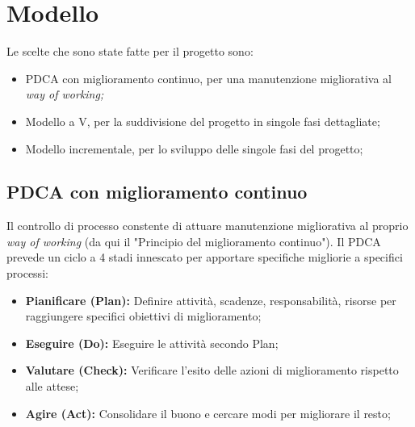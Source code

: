 \chapter{Modello}
Le scelte che sono state fatte per il progetto sono:
\begin{itemize}
    \item PDCA con miglioramento continuo, per una manutenzione migliorativa al \it{way of working};
    \item Modello a V, per la suddivisione del progetto in singole fasi dettagliate;
    \item Modello incrementale, per lo sviluppo delle singole fasi del progetto;
\end{itemize}

\section{PDCA con miglioramento continuo}
Il controllo di processo constente di attuare manutenzione migliorativa al proprio {\it{way of working}} (da qui il "Principio del miglioramento continuo"). Il PDCA prevede un ciclo a 4 stadi innescato per apportare specifiche migliorie a specifici processi:
\begin{itemize}
    \item \textbf{Pianificare (Plan):} Definire attività, scadenze, responsabilità, risorse per raggiungere
    specifici obiettivi di miglioramento; 
    \item \textbf{Eseguire (Do):} Eseguire le attività secondo Plan; 
    \item \textbf{Valutare (Check):} Verificare l’esito delle azioni di miglioramento rispetto alle attese;
    \item \textbf{Agire (Act):} Consolidare il buono e cercare modi per migliorare il resto;
\end{itemize}


